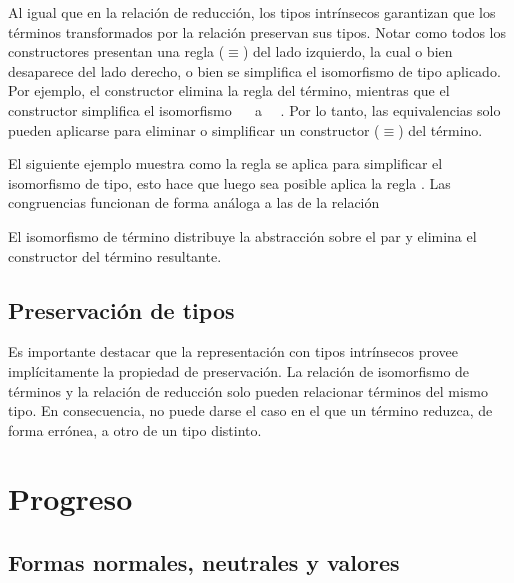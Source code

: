 Al igual que en la relación de reducción, los tipos intrínsecos garantizan que los términos transformados por la relación \const{[\_]$\equiv$\_} preservan sus tipos.
Notar como todos los constructores presentan una regla ($\equiv$) del lado izquierdo, la cual o bien desaparece del lado derecho, o bien se simplifica el isomorfismo de tipo aplicado.
Por ejemplo, el constructor  elimina la regla \const{[ comm ]$\equiv$\_} del término, mientras que el constructor  simplifica el isomorfismo \const{[ cong$\Rightarrow_2$}~~\const{]$\equiv$\_} a \const{[}~~\const{]$\equiv$\_}.
Por lo tanto, las equivalencias solo pueden aplicarse para eliminar o simplificar un constructor ($\equiv$) del término.

\begin{example}
	El siguiente ejemplo muestra como la regla  se aplica para simplificar el isomorfismo de tipo, esto hace que luego sea posible aplica la regla .
	Las congruencias funcionan de forma análoga a las de la relación \type{$\_\hookrightarrow\_$}
\end{example}

\begin{example}
	El isomorfismo de término  distribuye la abstracción sobre el par y elimina el constructor  del término resultante.
\end{example}

\subsection{Preservación de tipos}

Es importante destacar que la representación con tipos intrínsecos provee implícitamente la propiedad de preservación.
La relación de isomorfismo de términos \type{$\_\rightleftarrows\_$} y la relación de reducción \type{$\_\hookrightarrow\_$} solo pueden relacionar términos del mismo tipo. 
En consecuencia, no puede darse el caso en el que un término reduzca, de forma errónea, a otro de un tipo distinto.


\section{Progreso}

\subsection{Formas normales, neutrales y valores}


